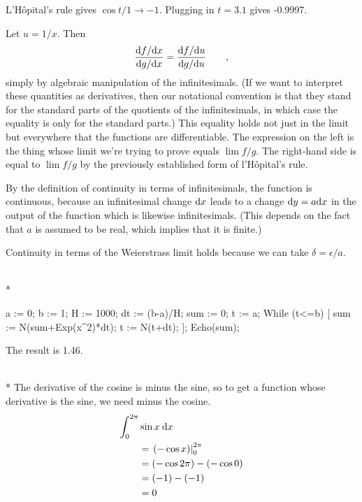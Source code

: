 L'H\^{o}pital's rule gives $\cos t/1\rightarrow -1$. Plugging in $t=3.1$
gives -0.9997.

Let $u=1/x$. Then
\begin{equation*}
  \frac{\textup{d} f/\textup{d} x}{\textup{d} g/\textup{d} x}  =   \frac{\textup{d} f/\textup{d} u}{\textup{d} g/\textup{d} u}  \qquad ,
\end{equation*}
simply by algebraic manipulation of the infinitesimals. (If we want to interpret these quantities as
derivatives, then our notational convention is that they stand for the standard parts of the quotients
of the infinitesimals, in which case the equality is only for the standard parts.) This equality  holds not just in the limit
but everywhere that the functions are differentiable. The expression on the left is the thing whose limit we're trying to
prove equals $\lim f/g$. The right-hand side is equal to $\lim f/g$ by the previously established form of l'H\^{o}pital's rule.

By the  definition of
continuity in terms of infinitesimals, the function is continuous, because an infinitesimal change $\textup{d} x$ leads
to a change $\textup{d} y=a\textup{d} x$ in the output of the function which is likewise infinitesimals. (This depends on the
fact that $a$ is assumed to be real, which implies that it is finite.)

Continuity in terms of the Weierstrass limit holds because we can take $\delta=\epsilon/a$.



\\*
\restartLineNumbers
\begin{Code}
  a := 0;
  b := 1;
  H := 1000;
  dt := (b-a)/H;
  sum := 0;
  t := a;
  While (t<=b) [
    sum := N(sum+Exp(x^2)*dt);
    t := N(t+dt);
  ];
  Echo(sum);
\end{Code}
The result is 1.46.


\\*
The derivative of the cosine is minus the sine, so to get a function whose
derivative is the sine, we need minus the cosine.
\begin{align*}
  \int_0^{2\pi} & \sin x \:\textup{d} x \\
    &= \left.(-\cos x)\right|_0^{2\pi} \\
    &= (-\cos 2\pi)-(-\cos 0) \\
    &= (-1)-(-1) \\
    &= 0
\end{align*}

